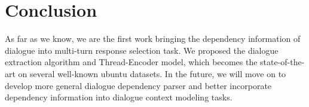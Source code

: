 \section{Conclusion}
As far as we know, we are the first work bringing the dependency information of 
dialogue into multi-turn response selection task. We proposed the dialogue extraction algorithm 
and Thread-Encoder model, which becomes the state-of-the-art on several well-known 
ubuntu datasets. In the future, we will move on to develop more general 
dialogue dependency parser and better incorporate dependency information into 
dialogue context modeling tasks.
